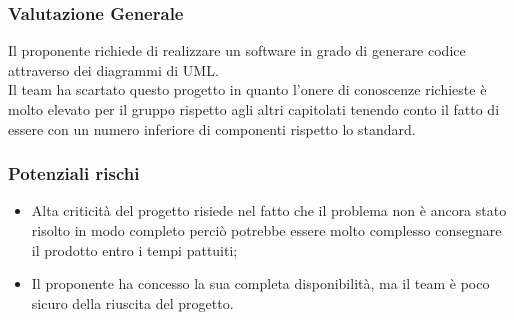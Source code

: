 \documentclass[12pt,a4paper,titlepage]{article}
\begin{document}
	\subsubsection{Valutazione Generale}
	Il proponente richiede di realizzare un software in grado di generare codice attraverso dei diagrammi di UML. \\
	Il team ha scartato questo progetto in quanto l'onere di conoscenze richieste è molto elevato per il gruppo rispetto agli altri capitolati tenendo conto il fatto di essere con un numero inferiore di componenti rispetto lo standard.
	\subsubsection{Potenziali rischi}
	\begin{itemize}
		\item Alta criticità del progetto risiede nel fatto che il problema non è ancora stato risolto in modo completo perciò potrebbe essere molto complesso consegnare il prodotto entro i tempi pattuiti;
		\item Il proponente ha concesso la sua completa disponibilità, ma il team è poco sicuro della riuscita del progetto.
	\end{itemize}
	
	
\end{document}
